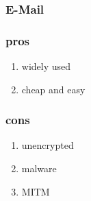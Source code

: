 \subsubsection{E-Mail}

\subsubsection{pros}

\begin{enumerate}
	\item widely used
	\item cheap and easy
\end{enumerate}

\subsubsection{cons}

\begin{enumerate}
	\item unencrypted
	\item malware
	\item MITM
\end{enumerate}

